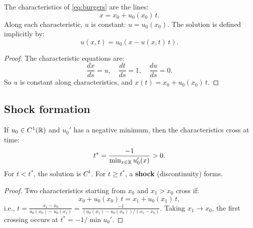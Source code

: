 \begin{theorem}
The characteristics of \eqref{eq:burgers} are the lines:
\[
    x = x_0 + u_0(x_0)\, t.
\]
Along each characteristic, $u$ is constant: $u = u_0(x_0)$.
The solution is defined implicitly by:
\begin{equation}\label{eq:burgers_implicit}
    u(x,t) = u_0(x - u(x,t)\, t).
\end{equation}
\end{theorem}

\begin{proof}
The characteristic equations are:
\[
    \frac{dx}{ds} = u, \quad \frac{dt}{ds} = 1, \quad \frac{du}{ds} = 0.
\]
So $u$ is constant along characteristics, and $x(t) = x_0 + u_0(x_0)\, t$.
\end{proof}

\subsection{Shock formation}

\begin{theorem}
If $u_0 \in C^1(\mathbb{R})$ and $u_0'$ has a negative minimum, then the
characteristics cross at time:
\begin{equation}\label{eq:shock_time}
    t^* = \frac{-1}{\min_{x \in \mathbb{R}} u_0'(x)} > 0.
\end{equation}
For $t < t^*$, the solution is $C^1$. For $t \geq t^*$, a \textbf{shock}
(discontinuity) forms.
\end{theorem}

\begin{proof}
Two characteristics starting from $x_0$ and $x_1 > x_0$ cross if:
\[
    x_0 + u_0(x_0)\, t = x_1 + u_0(x_1)\, t,
\]
i.e., $t = \frac{x_1 - x_0}{u_0(x_0) - u_0(x_1)} = \frac{-1}{(u_0(x_1)-u_0(x_0))/(x_1-x_0)}$.
Taking $x_1 \to x_0$, the first crossing occurs at $t^* = -1/\min u_0'$.
\end{proof}

\begin{center}
\end{center}


